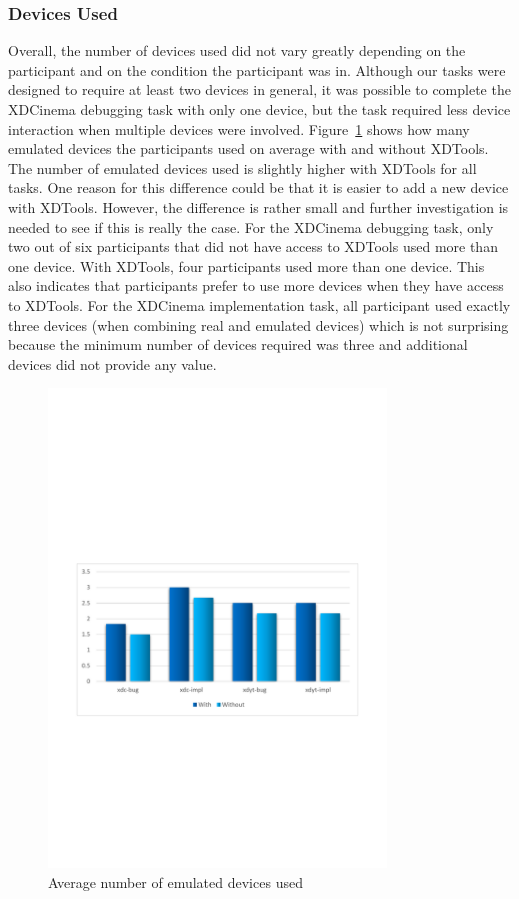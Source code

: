 \subsubsection{Devices Used}

Overall, the number of devices used did not vary greatly depending on the participant and on the condition the participant was in. Although our tasks were designed to require at least two devices in general, it was possible to complete the XDCinema debugging task with only one device, but the task required less device interaction when multiple devices were involved. Figure~\ref{fig:n_emulated} shows how many emulated devices the participants used on average with and without XDTools. The number of emulated devices used is slightly higher with XDTools for all tasks. One reason for this difference could be that it is easier to add a new device with XDTools. However, the difference is rather small and further investigation is needed to see if this is really the case. For the XDCinema debugging task, only two out of six participants that did not have access to XDTools used more than one device. With XDTools, four participants used more than one device. This also indicates that participants prefer to use more devices when they have access to XDTools. For the XDCinema implementation task, all participant used exactly three devices (when combining real and emulated devices) which is not surprising because the minimum number of devices required was three and additional devices did not provide any value. 

\begin{figure}[H]
  \centering
    \includegraphics[width=0.8\textwidth]{images/charts/n_emulated.pdf}
	\caption[Emulated device used]{Average number of emulated devices used}
	\label{fig:n_emulated}
\end{figure}

